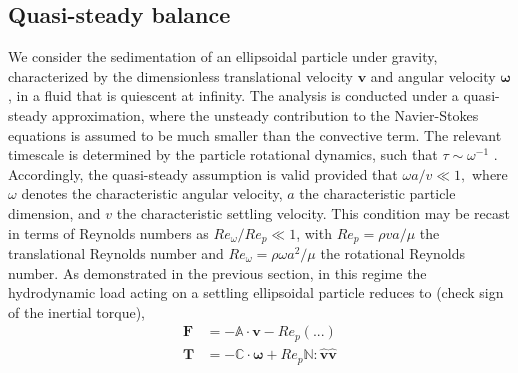 \documentclass[12pt]{My_preprint}
\begin{document}
\subsection{Quasi-steady balance}
We consider the sedimentation of an ellipsoidal particle under gravity, characterized by the dimensionless translational velocity $\mathbf{v}$ and angular velocity $\boldsymbol{\omega}$, in a fluid that is quiescent at infinity. 
The analysis is conducted under a quasi-steady approximation, where the unsteady contribution to the Navier-Stokes equations is assumed to be much smaller than the convective term. 
The relevant timescale is determined by the particle rotational dynamics, such that $\tau \sim \omega^{-1}$ \citep{cox1965,pierson2023}.
Accordingly, the quasi-steady assumption is valid provided that $\omega a/v \ll 1,$
where $\omega$ denotes the characteristic angular velocity, $a$ the characteristic particle dimension, and $v$ the characteristic settling velocity.
This condition may be recast in terms of Reynolds numbers as $Re_\omega/Re_p \ll 1$,
with $Re_p = \rho v a / \mu$ the translational Reynolds number and $Re_\omega = \rho \omega a^2 / \mu$ the rotational Reynolds number.
As demonstrated in the previous section, in this regime the hydrodynamic load acting on a settling ellipsoidal particle reduces to (check sign of the inertial torque),
\begin{align}
    \bm F &= - \mathbb{A} \cdot \bm v - Re_p (...)  \\
    \bm T &= - \mathbb{C} \cdot \bm \omega + Re_p\mathbb{N} : \hat{\bm  v} \hat{\bm v}
\end{align}
\end{document}
